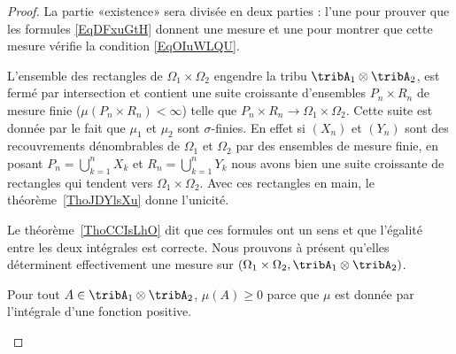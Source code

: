 \begin{proof}
	La partie «existence» sera divisée en deux parties : l'une pour prouver que les formules \eqref{EqDFxuGtH} donnent une mesure et une pour montrer que cette mesure vérifie la condition \eqref{EqOIuWLQU}.
	\begin{subproof}
		\spitem[Unicité]

		L'ensemble des rectangles de \( \Omega_1\times \Omega_2\) engendre la tribu \( \tribA_1\otimes\tribA_2\), est fermé par intersection et contient une suite croissante d'ensembles \( P_n\times R_n\) de mesure finie (\( \mu(P_n\times R_n)<\infty\)) telle que \( P_n\times R_n\to \Omega_1\times \Omega_2\). Cette suite est donnée par le fait que \( \mu_1\) et \( \mu_2\) sont \( \sigma\)-finies. En effet si \( (X_n)\) et \( (Y_n)\) sont des recouvrements dénombrables de \( \Omega_1\) et \( \Omega_2\) par des ensembles de mesure finie, en posant \( P_n=\bigcup_{k=1}^nX_k\) et \( R_n=\bigcup_{k=1}^nY_k\) nous avons bien une suite croissante de rectangles qui tendent vers \( \Omega_1\times \Omega_2\). Avec ces rectangles en main, le théorème~\ref{ThoJDYlsXu} donne l'unicité.

		Le théorème~\ref{ThoCCIsLhO} dit que ces formules ont un sens et que l'égalité entre les deux intégrales est correcte. Nous prouvons à présent qu'elles déterminent effectivement une mesure sur \( (\Omega_1\times\Omega_2,\tribA_1\otimes \tribA_2)\).

		Pour tout \( A\in \tribA_1\otimes \tribA_2\), \( \mu(A)\geq 0\) parce que \( \mu\) est donnée par l'intégrale d'une fonction positive.


\end{subproof}
\end{proof}
